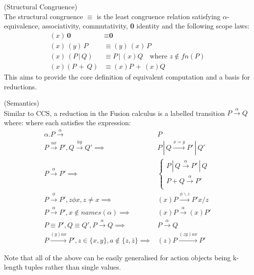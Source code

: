    \begin{definition}{(Structural Congruence)\\}
        \label{fusion-calculus-structural-congruence}
        The structural congruence $\equiv$ is the least congruence relation satisfying $\alpha$-equivalence, associativity, commutativity, \textbf{0} identity and the following scope laws:
        \begin{align}
            (x) \, \textbf{0}       & \equiv \textbf{0} \\
            (x) \, (y) \, P         & \equiv (y) \, (x) \, P \\
            (x) \, (P \, | \, Q)    & \equiv P \, | \, (x)Q \quad \text{where $z \notin fn(P)$} \\
            (x)(P \, + \, Q)        & \equiv (x)P \, + \, (x)Q
        \end{align}
        This aims to provide the core definition of equivalent computation and a basis for reductions.
    \end{definition}


    \begin{definition}{(Semantics)\\}
        Similar to CCS, a reduction in the Fusion calculus is a labelled transition $P \xrightarrow{\alpha} Q$ where:
        where each satisfies the expression:
        \begin{align}
            \alpha . P \xrightarrow{\alpha}                             & P \\
            P \xrightarrow{ux} P', Q \xrightarrow{\bar{u}y} Q' \implies & P \, | \, Q \xrightarrow{x = y} P' \, | \, Q' \\
            P \xrightarrow{\alpha} P' \implies                          &
            \begin{cases}
                P \, | \, Q \xrightarrow{\alpha} P' \, | \, Q \\
                P + Q \xrightarrow{\alpha} P' \\
            \end{cases} \\
            P \xrightarrow{\phi} P', z \phi x, z \neq x \implies                            & (x)P \xrightarrow{\phi \backslash z} P'{x / z} \\
            P \xrightarrow{\alpha} P', x \notin names(\alpha) \implies                      & (x)P \xrightarrow{\alpha} (x)P' \\
            P \equiv P', Q \equiv Q', P \xrightarrow{\alpha} Q \implies                     & P \xrightarrow{\alpha} Q \\
            P \xrightarrow{(y) a x} P', z \in \{x, y\}, a \notin \{z, \bar{z}\} \implies    & (z)P \xrightarrow{(z y) a x} P'
        \end{align}
    \end{definition}
    Note that all of the above can be easily generalised for action objects being k-length tuples rather than single values.


